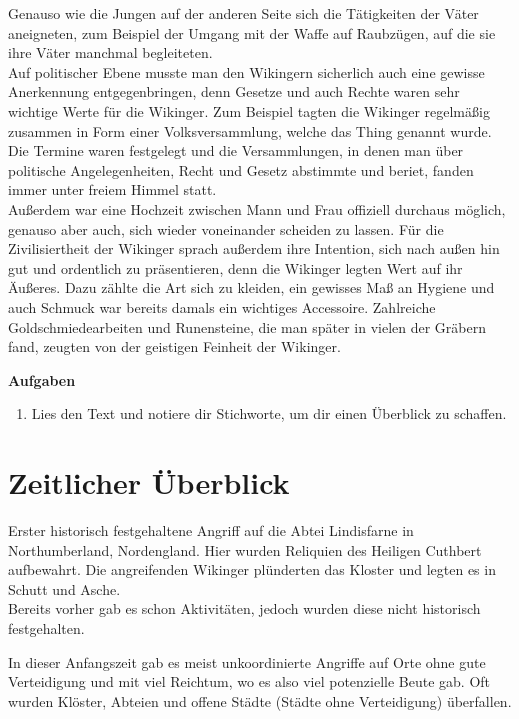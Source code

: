 \documentclass[12pt,a4paper,ngerman,openany]{book}
\newcommand{\aufgaben}[1]{
  \begin{tcolorbox}
    \textbf{Aufgaben}
    \begin{enumerate}
      #1
    \end{enumerate}
  \end{tcolorbox}
} %
\begin{document}
Genauso wie die Jungen auf der anderen Seite sich die Tätigkeiten der Väter aneigneten, zum Beispiel der Umgang mit der Waffe auf Raubzügen, auf die sie ihre Väter manchmal begleiteten.\\
Auf politischer Ebene musste man den Wikingern sicherlich auch eine gewisse Anerkennung entgegenbringen, denn Gesetze und auch Rechte waren sehr wichtige Werte für die Wikinger. Zum Beispiel tagten die Wikinger regelmäßig zusammen in Form einer Volksversammlung,
welche das \glqq Thing\grqq{} genannt wurde. Die Termine waren festgelegt und die Versammlungen, in denen man über politische Angelegenheiten, Recht und Gesetz abstimmte und beriet, fanden immer unter freiem Himmel statt.\\
Außerdem war eine Hochzeit zwischen Mann und Frau offiziell durchaus möglich, genauso aber auch, sich wieder voneinander scheiden zu lassen. 
Für die Zivilisiertheit der Wikinger sprach außerdem ihre Intention, sich nach außen hin gut und ordentlich zu präsentieren, denn die Wikinger legten Wert auf ihr Äußeres. Dazu zählte die Art sich zu kleiden,
ein gewisses Maß an Hygiene und auch Schmuck war bereits damals ein wichtiges Accessoire. Zahlreiche Goldschmiedearbeiten und Runensteine, die man später in vielen der Gräbern fand, zeugten von der geistigen Feinheit der Wikinger. 

\aufgaben {
  \item Lies den Text und notiere dir Stichworte, um dir einen Überblick zu schaffen.
}

\pagebreak

\section{Zeitlicher Überblick}

\begin{tcolorbox}[sharp corners, title=08. Juni 793]
Erster historisch festgehaltene Angriff auf die Abtei Lindisfarne in Northumberland, Nordengland. Hier wurden Reliquien des Heiligen Cuthbert aufbewahrt. Die angreifenden Wikinger plünderten das Kloster und legten es in Schutt und Asche.\\
Bereits vorher gab es schon Aktivitäten, jedoch wurden diese nicht historisch festgehalten.
\end{tcolorbox}

\begin{tcolorbox}[sharp corners, title=Ungefähr 800 bis 850]
In dieser Anfangszeit gab es meist unkoordinierte Angriffe auf Orte ohne gute Verteidigung und mit viel Reichtum, wo es also viel potenzielle Beute gab. Oft wurden Klöster, Abteien und offene Städte (Städte ohne Verteidigung) überfallen.
\end{tcolorbox}
\end{document}
